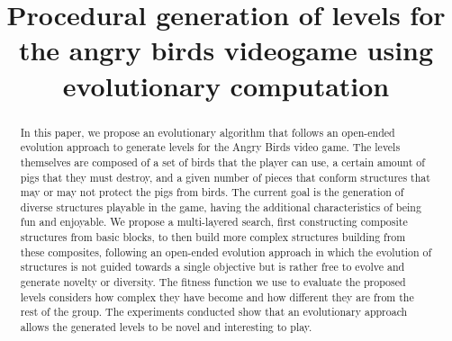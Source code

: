 \documentclass[conference]{IEEEtran}
\begin{document}
\title{Procedural generation of levels for the angry birds videogame using
evolutionary computation\\
}

\author{
\and
{} 
\and
{} }

\maketitle


\begin{abstract}
In this paper, we propose an evolutionary algorithm that follows an
open-ended evolution approach to generate levels for the Angry Birds video
game. The levels themselves are composed of a set of birds that the player
can use, a certain amount of pigs that they must destroy, and a given number
of pieces that conform structures that may or may not protect the pigs from
birds. The current goal is the generation of diverse structures playable in
the game, having the additional characteristics of being fun and enjoyable.
We propose a multi-layered search, first constructing composite structures
from basic blocks, to then build more complex structures building from these
composites, following an open-ended evolution approach in which the
evolution of structures is not guided towards a single objective but is
rather free to evolve and generate novelty or diversity. The fitness
function we use to evaluate the proposed levels considers how complex they
have become and how different they are from the rest of the group. The
experiments conducted show that an evolutionary approach allows the
generated levels to be novel and interesting to play.
\end{abstract}
\end{document}

